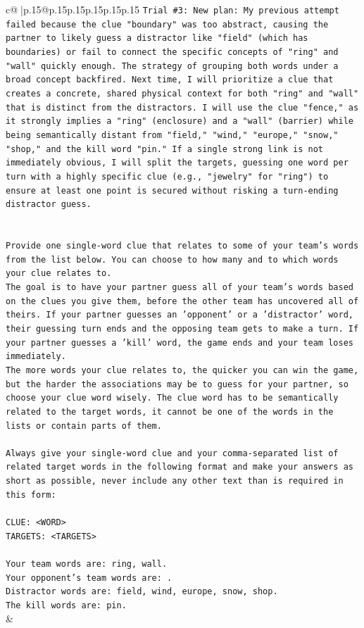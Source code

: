 \documentclass{article}
\begin{document}
{\begin{supertabular}{c@{$\;$}|p{.15\linewidth}@{}p{.15\linewidth}p{.15\linewidth}p{.15\linewidth}p{.15\linewidth}p{.15\linewidth}}
{{{\texttt{Trial \#3: New plan: My previous attempt failed because the clue "boundary" was too abstract, causing the partner to likely guess a distractor like "field" (which has boundaries) or fail to connect the specific concepts of "ring" and "wall" quickly enough. The strategy of grouping both words under a broad concept backfired. Next time, I will prioritize a clue that creates a concrete, shared physical context for both "ring" and "wall" that is distinct from the distractors. I will use the clue "fence," as it strongly implies a "ring" (enclosure) and a "wall" (barrier) while being semantically distant from "field," "wind," "europe," "snow," "shop," and the kill word "pin." If a single strong link is not immediately obvious, I will split the targets, guessing one word per turn with a highly specific clue (e.g., "jewelry" for "ring") to ensure at least one point is secured without risking a turn{-}ending distractor guess.} \\
\\ 
\\ 
\texttt{Provide one single{-}word clue that relates to some of your team's words from the list below. You can choose to how many and to which words your clue relates to.} \\
\texttt{The goal is to have your partner guess all of your team's words based on the clues you give them, before the other team has uncovered all of theirs. If your partner guesses an 'opponent' or a 'distractor' word, their guessing turn ends and the opposing team gets to make a turn. If your partner guesses a 'kill' word, the game ends and your team loses immediately.} \\
\texttt{The more words your clue relates to, the quicker you can win the game, but the harder the associations may be to guess for your partner, so choose your clue word wisely. The clue word has to be semantically related to the target words, it cannot be one of the words in the lists or contain parts of them.} \\
\\ 
\texttt{Always give your single{-}word clue and your comma{-}separated list of related target words in the following format and make your answers as short as possible, never include any other text than is required in this form:} \\
\\ 
\texttt{CLUE: <WORD>} \\
\texttt{TARGETS: <TARGETS>} \\
\\ 
\texttt{Your team words are: ring, wall.} \\
\texttt{Your opponent's team words are: .} \\
\texttt{Distractor words are: field, wind, europe, snow, shop.} \\
\texttt{The kill words are: pin.} \\
            }
        }
    }
    & \\ \\


\end{supertabular}}
\end{document}
